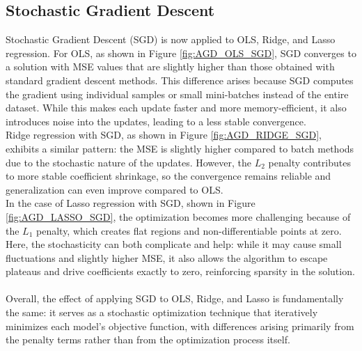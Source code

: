 \documentclass[
 reprint,            %
 amsmath,amssymb,
 aps,
]{revtex4-2}
\begin{document}



\subsection{Stochastic Gradient Descent}
\label{Stochastic Gradient Descent}
Stochastic Gradient Descent (SGD) is now applied to OLS, Ridge, and Lasso regression.
For OLS, as shown in Figure \ref{fig:AGD_OLS_SGD}, SGD converges to a solution with MSE values that are slightly higher than those obtained with standard gradient descent methods. 
This difference arises because SGD computes the gradient using individual samples or small mini-batches instead of the entire dataset.
While this makes each update faster and more memory-efficient, it also introduces noise into the updates, leading to a less stable convergence.\\
Ridge regression with SGD, as shown in Figure \ref{fig:AGD_RIDGE_SGD}, exhibits a similar pattern: the MSE is slightly higher compared to batch methods due to the stochastic nature of the updates.
However, the $L_2$ penalty contributes to more stable coefficient shrinkage, so the convergence remains reliable and generalization can even improve compared to OLS.\\
In the case of Lasso regression with SGD, shown in Figure \ref{fig:AGD_LASSO_SGD}, the optimization becomes more challenging because of the $L_1$ penalty, which creates flat regions and non-differentiable points at zero.
Here, the stochasticity can both complicate and help: while it may cause small fluctuations and slightly higher MSE, it also allows the algorithm to escape plateaus and drive coefficients exactly to zero, reinforcing sparsity in the solution.\\\\
Overall, the effect of applying SGD to OLS, Ridge, and Lasso is fundamentally the same: it serves as a stochastic optimization technique that iteratively minimizes each model’s objective function, with differences arising primarily from the penalty terms rather than from the optimization process itself.


\end{document}
